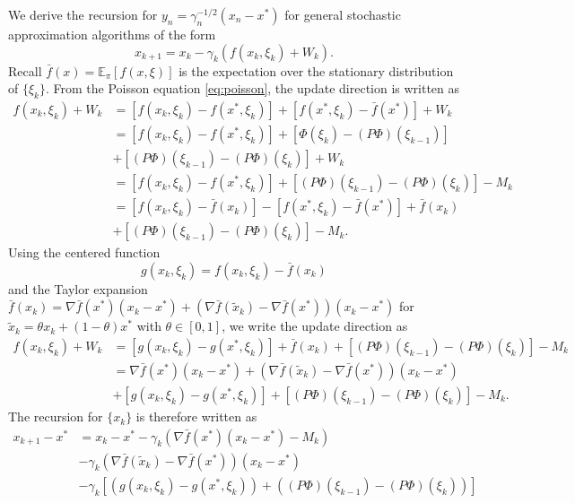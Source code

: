 \documentclass[11pt]{article}
\begin{document}
We derive the recursion for $y_n = \gamma_n^{-1/2}(x_n - x^*)$ for general stochastic approximation algorithms of the form
\begin{equation}
    x_{k+1} = x_k - \gamma_k (f(x_k, \xi_k) + W_k). 
\end{equation}
Recall $\bar{f}(x) = \mathbb{E}_\pi[f(x, \xi)]$ is the expectation over the stationary distribution of $\{\xi_k\}$. 
From the Poisson equation \eqref{eq:poisson}, the update direction is written as
\begin{align*}
    f(x_k, \xi_k) + W_k 
    &=
    \left[f(x_k, \xi_k) - f(x^*, \xi_k) \right]
    + \left[f(x^*, \xi_k) - \bar{f}(x^*)\right]  + W_k
    \\ &
    =
    \left[f(x_k, \xi_k) - f(x^*, \xi_k) \right]
    + \left[\Phi(\xi_k) - (P\Phi)(\xi_{k-1})\right] 
    \\ &
    +\left[(P\Phi)(\xi_{k-1}) - (P\Phi)(\xi_k) \right]
    + W_k
    \\
    &= \left[f(x_k, \xi_k) - f(x^*, \xi_k) \right]
    + \left[ (P\Phi)(\xi_{k-1}) - (P\Phi)(\xi_{k})\right] - M_k 
    \\ &
    = [f(x_k, \xi_k) - \bar{f}(x_k)]
    - [f(x^*, \xi_k) - \bar{f}(x^*)]
    + \bar{f}(x_k) 
    \\ &
    + \left[ (P\Phi)(\xi_{k-1}) - (P\Phi)(\xi_{k})\right] - M_k 
    .    
\end{align*}
Using the centered function
\begin{equation}\label{eq:gk}
    g(x_k, \xi_k) = f(x_k, \xi_k)  - \bar{f}(x_k)   
\end{equation}
and the Taylor expansion $\bar{f}(x_k) = \nabla \bar{f}(x^*)(x_k - x^*) + (\nabla \bar{f}(\tilde{x}_k) - \nabla \bar{f}(x^*))(x_k - x^*)$ for $\tilde{x}_k = \theta x_k + (1 - \theta) x^*$ with $\theta \in [0, 1]$, we write the update direction as
\begin{align*}
    f(x_k, \xi_k) + W_k 
    &= [g(x_k, \xi_k) - g(x^*, \xi_k)] + \bar{f}(x_k)
    + \left[ (P\Phi)(\xi_{k-1}) - (P\Phi)(\xi_{k})\right] - M_k 
    \\ &
    = \nabla \bar{f}(x^*) (x_k - x^*)
    + (\nabla \bar{f}(\tilde{x}_k) - \nabla \bar{f}(x^*)) (x_k - x^*)
    \\ &
    +[g(x_k, \xi_k) - g(x^*, \xi_k)]
    + \left[ (P\Phi)(\xi_{k-1}) - (P\Phi)(\xi_{k})\right] - M_k 
    .
\end{align*}
The recursion for $\{x_k\}$ is therefore written as
\begin{align*}
    x_{k+1} - x^* &=
    x_k - x^* - \gamma_k \left(\nabla \bar{f}(x^*)(x_k - x^*) - M_k \right)
    \\ &
    -
    \gamma_k (\nabla \bar{f}(\tilde{x}_k) - \nabla \bar{f}(x^*)) (x_k - x^*)
    \\ &
    - \gamma_k \left[ \left(g(x_k, \xi_k) - g(x^*, \xi_k)\right) + \left( (P\Phi)(\xi_{k-1}) - (P\Phi)(\xi_{k})\right) \right]
\end{align*}
\end{document}
